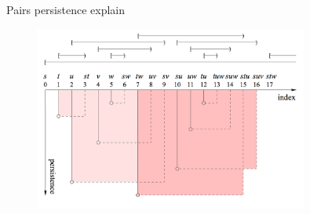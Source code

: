 \documentclass[10pt, compress]{beamer}
\begin{document}
\begin{frame}{Pairs persistence}
    explain
    \begin{figure}
        \centering
        \includegraphics[width=0.8\textwidth]{fig/pair_sim.png}
    \end{figure}
\end{frame}
\end{document}
